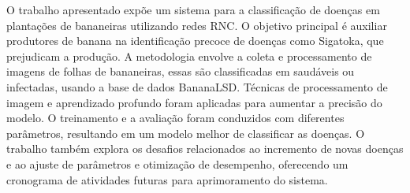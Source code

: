 O trabalho apresentado expõe um sistema para a classificação de doenças em plantações de bananeiras utilizando redes \ac{RNC}. O objetivo principal é auxiliar produtores de banana na identificação precoce de doenças como Sigatoka, que prejudicam a produção. A metodologia envolve a coleta e processamento de imagens de folhas de bananeiras, essas são classificadas em saudáveis ou infectadas, usando a base de dados \ac{BananaLSD}. Técnicas de processamento de imagem e aprendizado profundo foram aplicadas para aumentar a precisão do modelo. O treinamento e a avaliação foram conduzidos com diferentes parâmetros, resultando em um modelo melhor de classificar as doenças. O trabalho também explora os desafios relacionados ao incremento de novas doenças e ao ajuste de parâmetros e otimização de desempenho, oferecendo um cronograma de atividades futuras para aprimoramento do sistema. 


